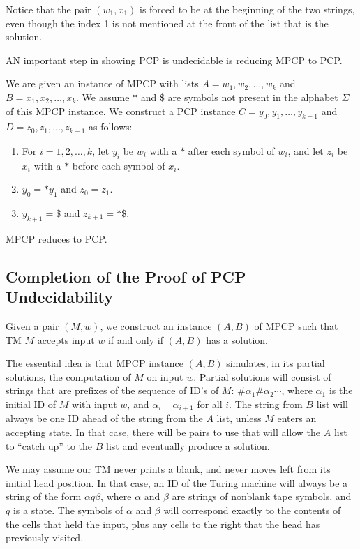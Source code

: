 \documentclass[]{article}
\begin{document}
Notice that the pair $(w_1,x_1)$ is forced to be at the beginning of the two
strings, even though the index 1 is not mentioned at the front of the list that
is the solution.

AN important step in showing PCP is undecidable is reducing MPCP to PCP.

We are given an instance of MPCP with lists $A = w_1,w_2,\ldots,w_k$ and $B =
x_1,x_2,\ldots,x_k$. We assume $*$ and \$ are symbols not present in the
alphabet $\Sigma$ of this MPCP instance. We construct a PCP instance $C =
y_0,y_1,\ldots,y_{k+1}$ and $D = z_0,z_1,\ldots,z_{k+1}$ as follows:
\begin{enumerate}
\item For $i = 1,2,\ldots,k$, let $y_i$ be $w_i$ with a $*$ after each symbol of
$w_i$, and let $z_i$ be $x_i$ with a $*$ before each symbol of $x_i$.
\item $y_0 = *y_1$ and $z_0 = z_1$.
\item $y_{k+1} = \$$ and $z_{k+1} = *\$$.
\end{enumerate}

\begin{thm}
MPCP reduces to PCP.
\end{thm}

\subsection*{Completion of the Proof of PCP Undecidability}
Given a pair $(M, w)$, we construct an instance $(A, B)$ of MPCP such that TM
$M$ accepts input $w$ if and only if $(A, B)$ has a solution.

The essential idea is that MPCP instance $(A, B)$ simulates, in its partial
solutions, the computation of $M$ on input $w$. Partial solutions will consist
of strings that are prefixes of the sequence of ID's of $M$:
$\#\alpha_1\#\alpha_2\cdots$, where $\alpha_1$ is the initial ID of $M$ with
input $w$, and $\alpha_i \vdash \alpha_{i+1}$ for all $i$. The string from $B$
list will always be one ID ahead of the string from the $A$ list, unless $M$
enters an accepting state. In that case, there will be pairs to use that will
allow the $A$ list to ``catch up'' to the $B$ list and eventually produce a
solution.

We may assume our TM never prints a blank, and never moves left from its initial
head position. In that case, an ID of the Turing machine will always be a string
of the form $\alpha{q}\beta$, where $\alpha$ and $\beta$ are strings of nonblank
tape symbols, and $q$ is a state. The symbols of $\alpha$ and $\beta$ will
correspond exactly to the contents of the cells that held the input, plus any
cells to the right that the head has previously visited.
\end{document}
